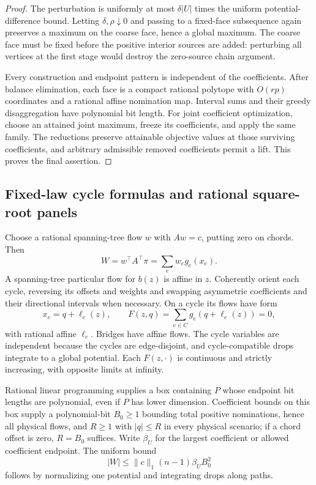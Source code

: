 \begin{proof}
The perturbation is uniformly at most $\delta|U|$ times the uniform
potential-difference bound. Letting $\delta,\rho\downarrow0$ and passing
to a fixed-face subsequence again preserves a maximum on the coarse face,
hence a global maximum. The coarse face must be fixed before the positive
interior sources are added: perturbing all vertices at the first stage
would destroy the zero-source chain argument.

Every construction and endpoint pattern is independent of the
coefficients. After balance elimination, each face is a compact rational
polytope with $O(rp)$ coordinates and a rational affine nomination map.
Interval sums and their greedy disaggregation have polynomial bit length.
For joint coefficient optimization, choose an attained joint maximum,
freeze its coefficients, and apply the same family. The reductions preserve
attainable objective values at those surviving coefficients, and arbitrary
admissible removed coefficients permit a lift. This proves the final
assertion.
\end{proof}

\subsection{Fixed-law cycle formulas and rational square-root panels}

Choose a rational spanning-tree flow $w$ with $Aw=c$, putting zero on
chords. Then
\begin{equation}
 W=w^\top A^\top\pi=\sum_e w_eg_e(x_e).
 \label{eq:a-wcac-weights}
\end{equation}
A spanning-tree particular flow for $b(z)$ is affine in $z$. Coherently
orient each cycle, reversing its offsets and weights and swapping
asymmetric coefficients and their directional intervals when necessary.
On a cycle its flows have form
\begin{equation}
 x_e=q+\ell_e(z),\qquad
 F(z,q)=\sum_{e\in C}g_e(q+\ell_e(z))=0,
 \label{eq:a-wcac-cycle}
\end{equation}
with rational affine $\ell_e$. Bridges have affine flows. The cycle
variables are independent because the cycles are edge-disjoint, and
cycle-compatible drops integrate to a global potential. Each $F(z,\cdot)$
is continuous and strictly increasing, with opposite limits at infinity.

Rational linear programming supplies a box containing $P$ whose endpoint
bit lengths are polynomial, even if $P$ has lower dimension.
Coefficient bounds on this box supply a polynomial-bit $B_0\ge1$ bounding
total positive nominations, hence all physical flows, and
$R\ge1$ with $|q|\le R$ in every physical scenario; if a chord offset is
zero, $R=B_0$ suffices. Write $\beta_U$ for the largest coefficient or
allowed coefficient endpoint. The uniform bound
\begin{equation}
 |W|\le \|c\|_1(n-1)\beta_U B_0^2
 \label{eq:a-wcac-value-bound}
\end{equation}
follows by normalizing one potential and integrating drops along paths.

